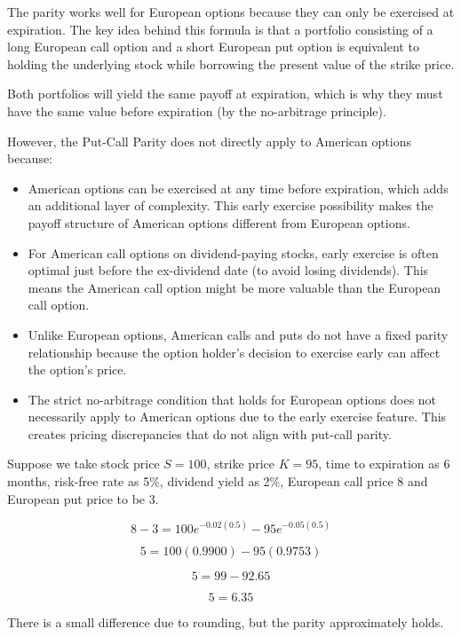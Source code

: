 \documentclass[letterpaper]{article}
\begin{document}
	 The parity works well for European options because they can only be exercised at expiration. The key idea behind this formula is that a portfolio consisting of a long European call option and a short European put option is equivalent to holding the underlying stock while borrowing the present value of the strike price.
	 
	 Both portfolios will yield the same payoff at expiration, which is why they must have the same value before expiration (by the no-arbitrage principle).
	 

	 However, the Put-Call Parity does not directly apply to American options because:
	 
	 \begin{itemize}
	 \item American options can be exercised at any time before expiration, which adds an additional layer of complexity. This early exercise possibility makes the payoff structure of American options different from European options.

	 \item For American call options on dividend-paying stocks, early exercise is often optimal just before the ex-dividend date (to avoid losing dividends). This means the American call option might be more valuable than the European call option.
	 
	 \item Unlike European options, American calls and puts do not have a fixed parity relationship because the option holder’s decision to exercise early can affect the option's price.
	 
	 \item The strict no-arbitrage condition that holds for European options does not necessarily apply to American options due to the early exercise feature. This creates pricing discrepancies that do not align with put-call parity.
	 
	\end{itemize}
	 
	  \begin{tcolorbox}[width=\linewidth, colframe=MidnightBlue, title=A Numerical Example]
	 Suppose we take stock price \( S = 100 \), strike price \( K = 95 \), time to expiration as 6 months, risk-free rate as 5\%, dividend yield as 2\%, European call price 8 and European put price to be 3.
	 
	 \[
	 8 - 3 = 100 e^{-0.02(0.5)} - 95 e^{-0.05(0.5)}
	 \]
	 
	 \[
	 5 = 100(0.9900) - 95(0.9753)
	 \]
	 
	 \[
	 5 = 99 - 92.65
	 \]
	 
	 \[
	 5 = 6.35
	 \]
	 
	 There is a small difference due to rounding, but the parity approximately holds.
	 \end{tcolorbox}
	 
\end{document}
